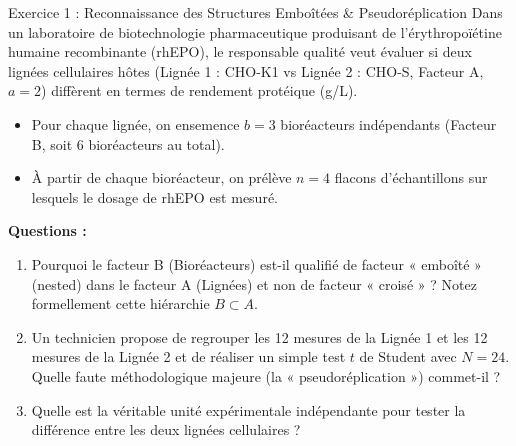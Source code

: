 \documentclass[11pt,a4paper]{article}
\begin{document}

\begin{exercicebox}{Exercice 1 : Reconnaissance des Structures Emboîtées \& Pseudoréplication}
Dans un laboratoire de biotechnologie pharmaceutique produisant de l'érythropoïétine humaine recombinante (rhEPO), le responsable qualité veut évaluer si deux lignées cellulaires hôtes (Lignée 1 : CHO-K1 vs Lignée 2 : CHO-S, Facteur A, $a = 2$) diffèrent en termes de rendement protéique (g/L).
\begin{itemize}
  \item Pour chaque lignée, on ensemence $b = 3$ bioréacteurs indépendants (Facteur B, soit 6 bioréacteurs au total).
  \item À partir de chaque bioréacteur, on prélève $n = 4$ flacons d'échantillons sur lesquels le dosage de rhEPO est mesuré.
\end{itemize}

\textbf{Questions :}
\begin{enumerate}[label=\textbf{\alph*.}]
  \item Pourquoi le facteur B (Bioréacteurs) est-il qualifié de facteur « emboîté » (nested) dans le facteur A (Lignées) et non de facteur « croisé » ? Notez formellement cette hiérarchie $B \subset A$.
  \item Un technicien propose de regrouper les 12 mesures de la Lignée 1 et les 12 mesures de la Lignée 2 et de réaliser un simple test $t$ de Student avec $N = 24$. Quelle faute méthodologique majeure (la « pseudoréplication ») commet-il ?
  \item Quelle est la véritable unité expérimentale indépendante pour tester la différence entre les deux lignées cellulaires ?
\end{enumerate}
\end{exercicebox}
\end{document}

